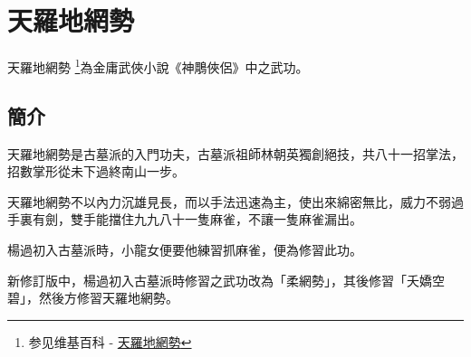 \chapter{天羅地網勢}
天羅地網勢
\footnote{参见维基百科 - \href{http://zh.wikipedia.org/wiki/\%E5\%A4\%A9\%E7\%BE\%85\%E5\%9C\%B0\%E7\%B6\%B2\%E5\%8B\%A2}{
    天羅地網勢}}為金庸武俠小說《神鵰俠侶》中之武功。

\section{簡介}

天羅地網勢是古墓派的入門功夫，古墓派祖師林朝英獨創絕技，共八十一招掌法，招數掌形從未下過終南山一步。

天羅地網勢不以內力沉雄見長，而以手法迅速為主，使出來綿密無比，威力不弱過手裏有劍，雙手能擋住九九八十一隻麻雀，不讓一隻麻雀漏出。

楊過初入古墓派時，小龍女便要他練習抓麻雀，便為修習此功。

新修訂版中，楊過初入古墓派時修習之武功改為「柔網勢」，其後修習「夭嬌空碧」，然後方修習天羅地網勢。

